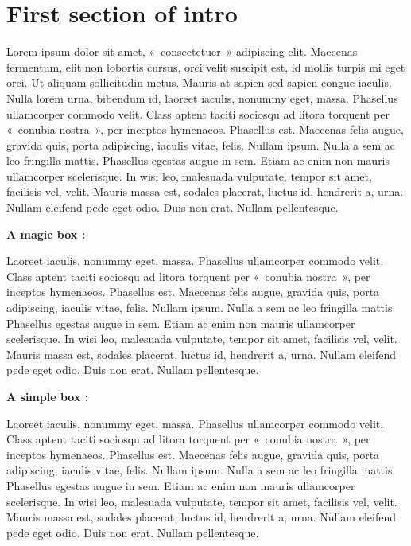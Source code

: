 \section*{First section of intro}
{}

Lorem ipsum dolor sit amet, «~consectetuer~» adipiscing elit. Maecenas fermentum, elit non lobortis cursus, orci velit suscipit est, id mollis turpis mi eget orci. Ut aliquam sollicitudin metus. Mauris at sapien sed sapien congue iaculis. Nulla lorem urna, bibendum id, laoreet iaculis, nonummy eget, massa. Phasellus ullamcorper commodo velit. Class aptent taciti sociosqu ad litora torquent per «~conubia nostra~», per inceptos hymenaeos. Phasellus est. Maecenas felis augue, gravida quis, porta adipiscing, iaculis vitae, felis. Nullam ipsum. Nulla a sem ac leo fringilla mattis. Phasellus egestas augue in sem. Etiam ac enim non mauris ullamcorper scelerisque. In wisi leo, malesuada vulputate, tempor sit amet, facilisis vel, velit. Mauris massa est, sodales placerat, luctus id, hendrerit a, urna. Nullam eleifend pede eget odio. Duis non erat. Nullam pellentesque.

\textbf{A magic box : }


Laoreet iaculis, nonummy eget, massa. Phasellus ullamcorper commodo velit. Class aptent taciti sociosqu ad litora torquent per «~conubia nostra~», per inceptos hymenaeos. Phasellus est. Maecenas felis augue, gravida quis, porta adipiscing, iaculis vitae, felis. Nullam ipsum. Nulla a sem ac leo fringilla mattis. Phasellus egestas augue in sem. Etiam ac enim non mauris ullamcorper scelerisque. In wisi leo, malesuada vulputate, tempor sit amet, facilisis vel, velit. Mauris massa est, sodales placerat, luctus id, hendrerit a, urna. Nullam eleifend pede eget odio. Duis non erat. Nullam pellentesque.

\textbf{A simple box : }

Laoreet iaculis, nonummy eget, massa. Phasellus ullamcorper commodo velit. Class aptent taciti sociosqu ad litora torquent per «~conubia nostra~», per inceptos hymenaeos. Phasellus est. Maecenas felis augue, gravida quis, porta adipiscing, iaculis vitae, felis. Nullam ipsum. Nulla a sem ac leo fringilla mattis. Phasellus egestas augue in sem. Etiam ac enim non mauris ullamcorper scelerisque. In wisi leo, malesuada vulputate, tempor sit amet, facilisis vel, velit. Mauris massa est, sodales placerat, luctus id, hendrerit a, urna. Nullam eleifend pede eget odio. Duis non erat. Nullam pellentesque.



